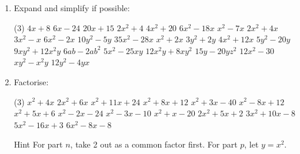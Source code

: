 \documentclass[fleqn, twoside]{article}
\begin{document}
\exercise{}
\begin{enumerate}
    \item Expand and simplify if possible:
        \begin{tasks}(3) %
              \task $4x+8$            %
              \task $6x-24$           %
              \task $20x+15$          %
              \task $2x^2+4$          %
              \task $4x^2+20$         %
              \task $6x^2-18x$        %
              \task $x^2-7x$          %
              \task $2x^2+4x$         %
              \task $3x^2-x$          %
              \task $6x^2-2x$         %
              \task $10y^2-5y$        %
              \task $35x^2-28x$       %
              \task $x^2+2x$          %
              \task $3y^2+2y$         %
              \task $4x^2+12x$        %
              \task $5y^2-20y$        %
              \task $9xy^2+12x^2y$    %
              \task $6ab-2ab^2$       %
              \task $5x^2-25xy$       %
              \task $12x^2y+8xy^2$    %
              \task $15y-20yz^2$      %
              \task $12x^2-30$        %
              \task $xy^2-x^2y$       %
              \task $12y^2-4yx$       %
        \end{tasks}
        \newpage
    \item Factorise:
        \begin{tasks}(3) %
            \task $x^2+4x$           %
            \task $2x^2+6x$          %
            \task $x^2+11x+24$       %
            \task $x^2+8x+12$        %
            \task $x^2+3x-40$        %
            \task $x^2-8x+12$        %
            \task $x^2+5x+6$         %
            \task $x^2-2x-24$        %
            \task $x^2-3x-10$        %
            \task $x^2+x-20$         %
            \task $2x^2+5x+2$        %
            \task $3x^2+10x-8$       %
            \task $5x^2-16x+3$       %
            \task $6x^2-8x-8$        %
            \task[]
                \hspace*{-2.25cm}
                \begin{minipage}[t][][c]{0.42\textwidth}
                \vspace{-0.3cm}
                \begin{note*}{Hint}{}
                     For part $n$, take 2 out as a common factor first. For part $p$, let $y=x^2$.
                 \end{note*}

\end{minipage}
\end{tasks}
\end{enumerate}
\end{document}
